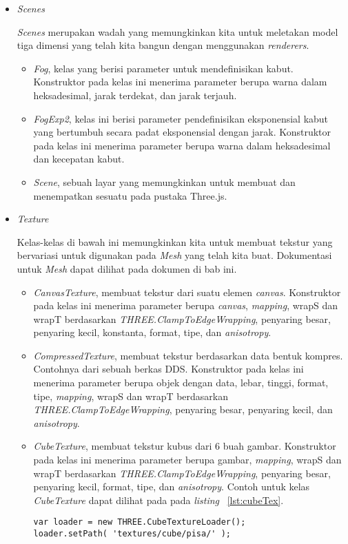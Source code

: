 \begin{itemize}
	\item \textit{Scenes}

	{\it Scenes} merupakan wadah yang memungkinkan kita untuk meletakan model tiga dimensi yang telah kita bangun dengan menggunakan {\it renderers}. 
	
	\begin{itemize}
		\item {\it Fog}, kelas yang berisi parameter untuk mendefinisikan kabut. Konstruktor pada kelas ini menerima parameter berupa warna dalam heksadesimal, jarak terdekat, dan jarak terjauh.
		\item {\it FogExp2}, kelas ini berisi parameter pendefinisikan eksponensial kabut yang bertumbuh secara padat eksponensial dengan jarak. Konstruktor pada kelas ini menerima parameter berupa warna dalam heksadesimal dan kecepatan kabut.
		\item {\it Scene}, sebuah layar yang memungkinkan untuk membuat dan menempatkan sesuatu pada pustaka Three.js. 
	\end{itemize}
	
	
	\item \textit{Texture}

	Kelas-kelas di bawah ini memungkinkan kita untuk membuat tekstur yang bervariasi untuk digunakan pada {\it Mesh} yang telah kita buat. Dokumentasi untuk {\it Mesh} dapat dilihat pada dokumen di bab ini.
	
	\begin{itemize}
	
		\item{\it CanvasTexture}, membuat tekstur dari suatu elemen {\it canvas}. Konstruktor pada kelas ini menerima parameter berupa {\it canvas}, {\it mapping}, wrapS dan wrapT berdasarkan {\it THREE.ClampToEdgeWrapping}, penyaring besar, penyaring kecil, konstanta, format, tipe, dan {\it anisotropy}.
		\item{\it CompressedTexture}, membuat tekstur berdasarkan data bentuk kompres. Contohnya dari sebuah berkas DDS. Konstruktor pada kelas ini menerima parameter berupa objek dengan data, lebar, tinggi, format, tipe, {\it mapping}, wrapS dan wrapT berdasarkan {\it THREE.ClampToEdgeWrapping}, penyaring besar, penyaring kecil, dan {\it anisotropy}.
		\item{\it CubeTexture}, membuat tekstur kubus dari 6 buah gambar. Konstruktor pada kelas ini menerima parameter berupa gambar, {\it mapping},  wrapS dan wrapT berdasarkan {\it THREE.ClampToEdgeWrapping}, penyaring besar, penyaring kecil, format, tipe, dan {\it anisotropy}. Contoh untuk kelas {\it CubeTexture} dapat dilihat pada pada {\it listing} ~\ref{lst:cubeTex}.
\begin{lstlisting}[caption={Contoh penggunaan kelas {\it CubeTexture}.}, label={lst:cubeTex},captionpos=b]
var loader = new THREE.CubeTextureLoader();
loader.setPath( 'textures/cube/pisa/' );


\end{lstlisting}
\end{itemize}
\end{itemize}
